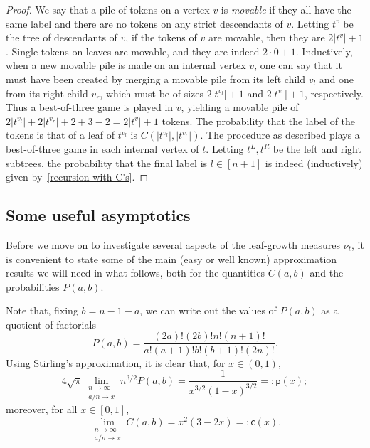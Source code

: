 \documentclass[11pt]{article}
\newcommand{\pp}{\mathsf{p}}
\newcommand{\cc}{\mathsf{c}}
\newcommand{\sT}{\mathsf{T}} %
\begin{document}
\begin{proof}We say that a pile of tokens on a vertex $v$ is \emph{movable} if they all have the same label and there are no tokens on any strict descendants of $v$. Letting $t^v$ be the tree of descendants of $v$, if the tokens of $v$ are movable, then they are $2|t^v|+1$. Single tokens on leaves are movable, and they are indeed $2\cdot 0+1$. Inductively, when a new movable pile is made on an internal vertex $v$, one can say that it must have been created by merging a movable pile from its left child $v_l$ and one from its right child $v_r$, which must be of sizes $2|t^{v_l}|+1$ and $2|t^{v_r}|+1$, respectively. Thus a best-of-three game is played in $v$, yielding a movable pile of $2|t^{v_l}|+2|t^{v_r}|+2+3-2=2|t^v|+1$ tokens. The probability that the label of the tokens is that of a leaf of $t^{v_l}$ is $C(|t^{v_l}|,|t^{v_r}|)$.
The procedure as described plays a best-of-three game in each internal vertex of $t$. Letting $t^L, t^R$ be the left and right subtrees, the probability that the final label is $l\in[n+1]$ is indeed (inductively) given by~\eqref{recursion with C's}.
\end{proof}

\subsection{Some useful asymptotics}
Before we move on to investigate several aspects of the leaf-growth measures $\nu_t$, it is convenient to state some of the main (easy or well known) approximation results we will need in what follows, both for the quantities $C(a,b)$ and the probabilities $P(a,b)$. \medskip 



Note that, fixing $b=n-1-a$, we can write out the values of $P(a,b)$ as a quotient of factorials
\[P(a,b)=\frac{(2a)!(2b)!n!(n+1)!}{a!(a+1)!b!(b+1)!(2n)!}.\]
Using Stirling's approximation, it is clear that, for $x\in(0,1),$
\begin{equation}\label{Stirlinglimit}
4\sqrt{\pi}\lim_{\substack{n\to\infty \\ a/n \to x}}n^{3/2} P(a,b)=\frac{1}{x^{3/2}(1-x)^{3/2}}=:\pp(x);
\end{equation}
moreover, for all $x\in [0,1]$,
\begin{equation}\label{eq:cc}
 \lim_{\substack{n\to\infty \\ a/n \to x}}C(a,b)=x^2(3-2x)=:\cc(x).\end{equation}
\end{document}
